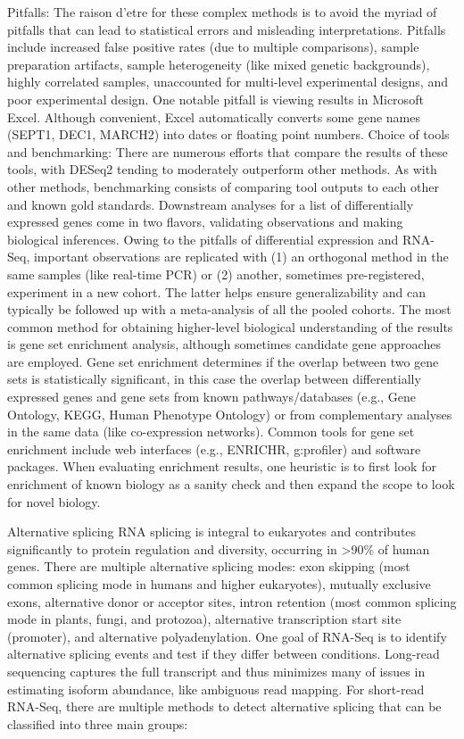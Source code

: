 Pitfalls: The raison d'etre for these complex methods is to avoid the myriad of pitfalls that can lead to statistical errors and misleading interpretations. Pitfalls include increased false positive rates (due to multiple comparisons), sample preparation artifacts, sample heterogeneity (like mixed genetic backgrounds), highly correlated samples, unaccounted for multi-level experimental designs, and poor experimental design. One notable pitfall is viewing results in Microsoft Excel. Although convenient, Excel automatically converts some gene names (SEPT1, DEC1, MARCH2) into dates or floating point numbers.
Choice of tools and benchmarking: There are numerous efforts that compare the results of these tools, with DESeq2 tending to moderately outperform other methods. As with other methods, benchmarking consists of comparing tool outputs to each other and known gold standards.
Downstream analyses for a list of differentially expressed genes come in two flavors, validating observations and making biological inferences. Owing to the pitfalls of differential expression and RNA-Seq, important observations are replicated with (1) an orthogonal method in the same samples (like real-time PCR) or (2) another, sometimes pre-registered, experiment in a new cohort. The latter helps ensure generalizability and can typically be followed up with a meta-analysis of all the pooled cohorts. The most common method for obtaining higher-level biological understanding of the results is gene set enrichment analysis, although sometimes candidate gene approaches are employed. Gene set enrichment determines if the overlap between two gene sets is statistically significant, in this case the overlap between differentially expressed genes and gene sets from known pathways/databases (e.g., Gene Ontology, KEGG, Human Phenotype Ontology) or from complementary analyses in the same data (like co-expression networks). Common tools for gene set enrichment include web interfaces (e.g., ENRICHR, g:profiler) and software packages. When evaluating enrichment results, one heuristic is to first look for enrichment of known biology as a sanity check and then expand the scope to look for novel biology.

Alternative splicing
RNA splicing is integral to eukaryotes and contributes significantly to protein regulation and diversity, occurring in \textgreater{}90\% of human genes. There are multiple alternative splicing modes: exon skipping (most common splicing mode in humans and higher eukaryotes), mutually exclusive exons, alternative donor or acceptor sites, intron retention (most common splicing mode in plants, fungi, and protozoa), alternative transcription start site (promoter), and alternative polyadenylation. One goal of RNA-Seq is to identify alternative splicing events and test if they differ between conditions. Long-read sequencing captures the full transcript and thus minimizes many of issues in estimating isoform abundance, like ambiguous read mapping. For short-read RNA-Seq, there are multiple methods to detect alternative splicing that can be classified into three main groups:


